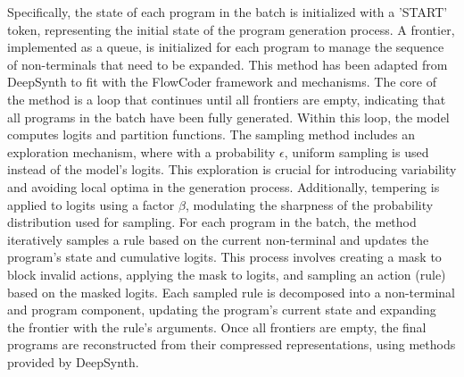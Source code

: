Specifically, the state of each program in the batch is initialized with a 'START' token, representing the initial state of the program generation process. A frontier, implemented as a queue, is initialized for each program to manage the sequence of non-terminals that need to be expanded. This method has been adapted from DeepSynth to fit with the FlowCoder framework and mechanisms. 
The core of the method is a loop that continues until all frontiers are empty, indicating that all programs in the batch have been fully generated. Within this loop, the model computes logits and partition functions.
The sampling method includes an exploration mechanism, where with a probability $\epsilon$, uniform sampling is used instead of the model's logits. This exploration is crucial for introducing variability and avoiding local optima in the generation process. Additionally, tempering is applied to logits using a factor $\beta$, modulating the sharpness of the probability distribution used for sampling.
For each program in the batch, the method iteratively samples a rule based on the current non-terminal and updates the program's state and cumulative logits. This process involves creating a mask to block invalid actions, applying the mask to logits, and sampling an action (rule) based on the masked logits.
Each sampled rule is decomposed into a non-terminal and program component, updating the program's current state and expanding the frontier with the rule's arguments.
Once all frontiers are empty, the final programs are reconstructed from their compressed representations, using methods provided by DeepSynth.

